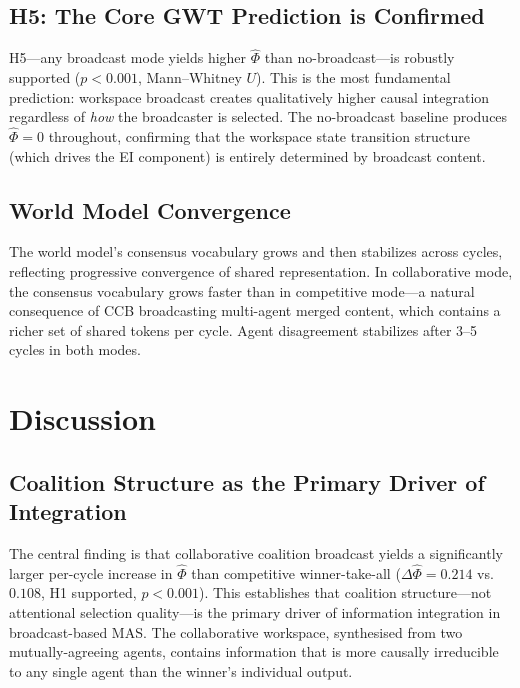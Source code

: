 \documentclass[11pt]{article}
\theoremstyle{definition}
\begin{document}
\subsection{H5: The Core GWT Prediction is Confirmed}

H5---any broadcast mode yields higher $\hat{\Phi}$ than no-broadcast---is robustly
supported ($p < 0.001$, Mann--Whitney $U$). This is the most fundamental prediction:
workspace broadcast creates qualitatively higher causal integration regardless of \textit{how}
the broadcaster is selected. The no-broadcast baseline produces $\hat{\Phi} = 0$ throughout,
confirming that the workspace state transition structure (which drives the EI component) is
entirely determined by broadcast content.

\subsection{World Model Convergence}

The world model's consensus vocabulary grows and then stabilizes across cycles, reflecting
progressive convergence of shared representation. In collaborative mode, the consensus
vocabulary grows faster than in competitive mode---a natural consequence of CCB broadcasting
multi-agent merged content, which contains a richer set of shared tokens per cycle.
Agent disagreement stabilizes after 3--5 cycles in both modes.


\section{Discussion}
\label{sec:discussion}

\subsection{Coalition Structure as the Primary Driver of Integration}

The central finding is that collaborative coalition broadcast yields a significantly larger
per-cycle increase in $\hat{\Phi}$ than competitive winner-take-all ($\Delta\hat{\Phi} = 0.214$
vs.\ $0.108$, H1 supported, $p < 0.001$). This establishes that coalition structure---not
attentional selection quality---is the primary driver of information integration in broadcast-based
MAS. The collaborative workspace, synthesised from two mutually-agreeing agents, contains information
that is more causally irreducible to any single agent than the winner's individual output.
\end{document}
